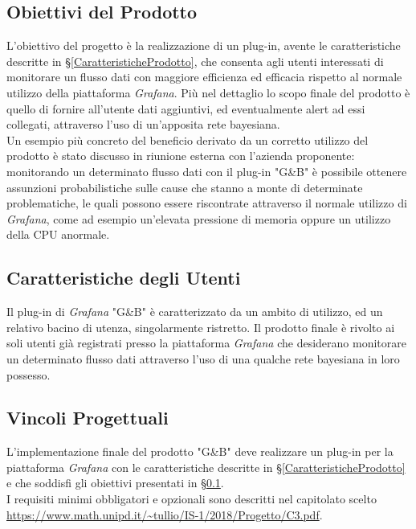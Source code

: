 \subsection{Obiettivi del Prodotto}\label{ObiettiviProdotto}
L'obiettivo del progetto è la realizzazione di un plug-in, avente le caratteristiche descritte in §\ref{CaratteristicheProdotto}, che consenta agli utenti interessati di monitorare un flusso dati con maggiore efficienza ed efficacia rispetto al normale utilizzo della piattaforma \textit{Grafana}. Più nel dettaglio lo scopo finale del prodotto è quello di fornire all'utente dati aggiuntivi, ed eventualmente alert ad essi collegati, attraverso l'uso di un'apposita rete bayesiana.\\
Un esempio più concreto del beneficio derivato da un corretto utilizzo del prodotto è stato discusso in riunione esterna con l'azienda proponente: monitorando un determinato flusso dati con il plug-in "G\&B" è possibile ottenere assunzioni probabilistiche sulle cause che stanno a monte di determinate problematiche, le quali possono essere riscontrate attraverso il normale utilizzo di \textit{Grafana}, come ad esempio un'elevata pressione di memoria oppure un utilizzo della CPU anormale.

\subsection{Caratteristiche degli Utenti}\label{CaratteristicheUtenti}
Il plug-in di \textit{Grafana} "G\&B" è caratterizzato da un ambito di utilizzo, ed un relativo bacino di utenza, singolarmente ristretto. Il prodotto finale è rivolto ai soli utenti già registrati presso la piattaforma \textit{Grafana} che desiderano monitorare un determinato flusso dati attraverso l'uso di una qualche rete bayesiana in loro possesso.

\subsection{Vincoli Progettuali}\label{VincoliProgettuali}
L'implementazione finale del prodotto "G\&B" deve realizzare un plug-in per la piattaforma \textit{Grafana} con le caratteristiche descritte in §\ref{CaratteristicheProdotto} e che soddisfi gli obiettivi presentati in §\ref{ObiettiviProdotto}. \\
I requisiti minimi obbligatori e opzionali sono descritti nel capitolato scelto  \url{https://www.math.unipd.it/~tullio/IS-1/2018/Progetto/C3.pdf}.

